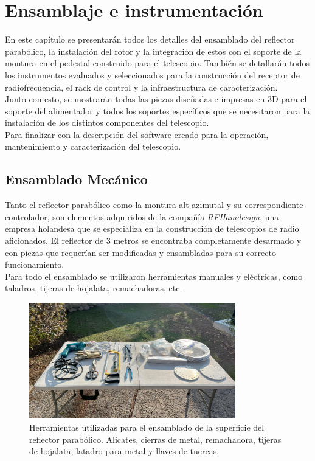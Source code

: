 \chapter{Ensamblaje e instrumentación}

En este capítulo se presentarán todos los detalles del ensamblado del reflector parabólico, la instalación del rotor y la integración de estos con el soporte de la montura en el pedestal construido para el telescopio. También se detallarán todos los instrumentos evaluados y seleccionados para la construcción del receptor de radiofrecuencia, el rack de control y la infraestructura de caracterización.\\

Junto con esto, se mostrarán todas las piezas diseñadas e impresas en 3D para el soporte del alimentador y todos los soportes específicos que se necesitaron para la instalación de los distintos componentes del telescopio.\\

Para finalizar con la descripción del software creado para la operación, mantenimiento y caracterización del telescopio.\\

\section{Ensamblado Mecánico}

Tanto el reflector parabólico como la montura alt-azimutal y su correspondiente controlador, son elementos adquiridos de la compañía \textit{RFHamdesign}, una empresa holandesa que se especializa en la construcción de telescopios de radio aficionados. El reflector de 3 metros se encontraba completamente desarmado y con piezas que requerían ser modificadas y ensambladas para su correcto funcionamiento.\\

Para todo el ensamblado se utilizaron herramientas manuales y eléctricas, como taladros, tijeras de hojalata, remachadoras, etc.\\

\begin{figure}
    \centering
    \includegraphics[width=0.8\textwidth]{img/herramientas}
    \caption{Herramientas utilizadas para el ensamblado de la superficie del reflector parabólico. Alicates, cierras de metal, remachadora, tijeras de hojalata, latadro para metal y llaves de tuercas.}
    \label{fig:ensamblado1}
\end{figure}

